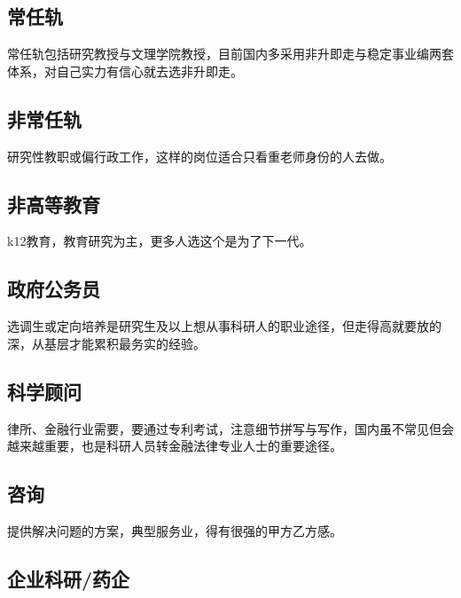 \documentclass[]{tufte-book}
\begin{document}
\hypertarget{ux5e38ux4efbux8f68}{%
\subsection{常任轨}\label{ux5e38ux4efbux8f68}}

常任轨包括研究教授与文理学院教授，目前国内多采用非升即走与稳定事业编两套体系，对自己实力有信心就去选非升即走。

\hypertarget{ux975eux5e38ux4efbux8f68}{%
\subsection{非常任轨}\label{ux975eux5e38ux4efbux8f68}}

研究性教职或偏行政工作，这样的岗位适合只看重老师身份的人去做。

\hypertarget{ux975eux9ad8ux7b49ux6559ux80b2}{%
\subsection{非高等教育}\label{ux975eux9ad8ux7b49ux6559ux80b2}}

k12教育，教育研究为主，更多人选这个是为了下一代。

\hypertarget{ux653fux5e9cux516cux52a1ux5458}{%
\subsection{政府公务员}\label{ux653fux5e9cux516cux52a1ux5458}}

选调生或定向培养是研究生及以上想从事科研人的职业途径，但走得高就要放的深，从基层才能累积最务实的经验。

\hypertarget{ux79d1ux5b66ux987eux95ee}{%
\subsection{科学顾问}\label{ux79d1ux5b66ux987eux95ee}}

律所、金融行业需要，要通过专利考试，注意细节拼写与写作，国内虽不常见但会越来越重要，也是科研人员转金融法律专业人士的重要途径。

\hypertarget{ux54a8ux8be2}{%
\subsection{咨询}\label{ux54a8ux8be2}}

提供解决问题的方案，典型服务业，得有很强的甲方乙方感。

\hypertarget{ux4f01ux4e1aux79d1ux7814ux836fux4f01}{%
\subsection{企业科研/药企}\label{ux4f01ux4e1aux79d1ux7814ux836fux4f01}}
\end{document}
